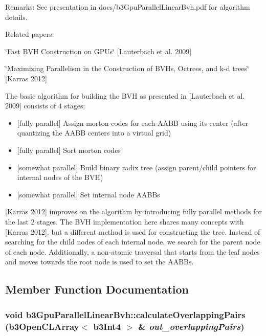 \begin{Desc}
\item[Remarks:]See presentation in docs/b3GpuParallelLinearBvh.pdf for algorithm details. \end{Desc}
\begin{Desc}
\item[]Related papers: \par
 \char`\"{}Fast BVH Construction on GPUs\char`\"{} \mbox{[}Lauterbach et al. 2009\mbox{]} \par
 \char`\"{}Maximizing Parallelism in the Construction of BVHs, Octrees, and k-d trees\char`\"{} \mbox{[}Karras 2012\mbox{]} \par
 \end{Desc}
\begin{Desc}
\item[]The basic algorithm for building the BVH as presented in \mbox{[}Lauterbach et al. 2009\mbox{]} consists of 4 stages:\begin{itemize}
\item \mbox{[}fully parallel\mbox{]} Assign morton codes for each AABB using its center (after quantizing the AABB centers into a virtual grid)\item \mbox{[}fully parallel\mbox{]} Sort morton codes\item \mbox{[}somewhat parallel\mbox{]} Build binary radix tree (assign parent/child pointers for internal nodes of the BVH)\item \mbox{[}somewhat parallel\mbox{]} Set internal node AABBs \end{itemize}
\end{Desc}
\begin{Desc}
\item[]\mbox{[}Karras 2012\mbox{]} improves on the algorithm by introducing fully parallel methods for the last 2 stages. The BVH implementation here shares many concepts with \mbox{[}Karras 2012\mbox{]}, but a different method is used for constructing the tree. Instead of searching for the child nodes of each internal node, we search for the parent node of each node. Additionally, a non-atomic traversal that starts from the leaf nodes and moves towards the root node is used to set the AABBs. \end{Desc}


\subsection{Member Function Documentation}
\hypertarget{classb3_gpu_parallel_linear_bvh_c0208fca9279bdfd66eabd321d98420b}{
\subsubsection[calculateOverlappingPairs]{\setlength{\rightskip}{0pt plus 5cm}void b3GpuParallelLinearBvh::calculateOverlappingPairs (b3OpenCLArray$<$ b3Int4 $>$ \& {\em out\_\-overlappingPairs})}}
\label{classb3_gpu_parallel_linear_bvh_c0208fca9279bdfd66eabd321d98420b}


